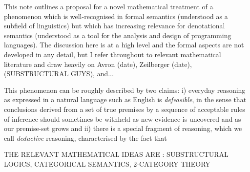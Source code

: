 \documentclass[a4paper,11pt]{report}
\begin{document}
This note outlines a proposal for a novel mathematical treatment of a phenomenon which is well-recognised in formal semantics (understood as a subfield of linguistics) but which has increasing relevance for denotational semantics (understood as a tool for the analysis and design of programming languages). The discussion here is at a high level and the formal aspects are not developed in any detail, but I refer throughout to relevant mathematical literature and draw heavily on Avron (date), Zeilberger (date), (SUBSTRUCTURAL GUYS), and...

This phenomenon can be roughly described by two claims: i) everyday reasoning as expressed in a natural language such as English is \emph{defeasible}, in the sense that conclusions derived from a set of true premises by a sequence of acceptable rules of inference should sometimes be withheld as new evidence is uncovered and as our premise-set grows and ii) there is a special fragment of reasoning, which we call \emph{deductive} reasoning, characterised by the fact that 

THE RELEVANT MATHEMATICAL IDEAS ARE : SUBSTRUCTURAL LOGICS, CATEGORICAL SEMANTICS, 2-CATEGORY THEORY
\end{document}
